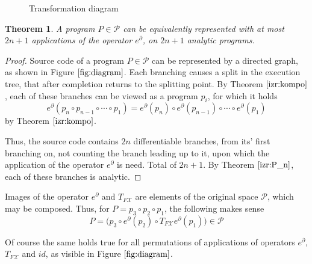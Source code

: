 \documentclass{article}
\newcommand{\X}{\mathcal{X}}
\newcommand{\dP}{\mathcal{P}}
\newcommand{\D}{\partial}
\newtheorem{izrek}{Theorem}[section]
\begin{document}
\begin{figure}[!h]
\vspace{3px}
\caption{Transformation diagram} \label{fig:diagram} 
\end{figure}

\begin{izrek}
A program $P\in\dP$ can be equivalently represented with at most $2n+1$ applications of the operator $e^\D$, on $2n+1$ analytic programs.
\end{izrek}

\begin{proof}
	Source code of a program $P\in\dP$ can be represented by a directed graph, as shown in Figure $\ref{fig:diagram}$. Each branching causes a split in the execution tree, that after completion returns to the splitting point.
	By Theorem $\ref{izr:kompo}$, each of these branches can be viewed as a program $p_i$, for which it holds $$e^\D(p_n\circ p_{n-1}\circ\cdots\circ p_1)=e^\D(p_n)\circ e^\D(p_{n-1})\circ\cdots\circ e^\D(p_1)$$ by Theorem $\ref{izr:kompo}$.
	
	Thus, the source code contains $2n$ differentiable branches, from its' first branching on, not counting the branch leading up to it, upon which the application of the operator $e^\D$ is need. Total of $2n+1$. By Theorem $\ref{izr:P_n}$, each of these branches is analytic.
\end{proof}

Images of the operator $e^\D$ and $T_{F\X}$  are elements of the original space $\dP$, which may be composed. Thus, for $P=p_3\circ p_2\circ p_1$, the following makes sense
\begin{equation}
P=\Big(p_3\circ e^ \D(p_2)\circ T_{F\X}e^\D(p_1)\Big) \in \dP
\end{equation}

Of course the same holds true for all permutations of applications of operators $e^\D$, $T_{F\X}$ and $id$, as visible in Figure $\ref{fig:diagram}$.
\end{document}
